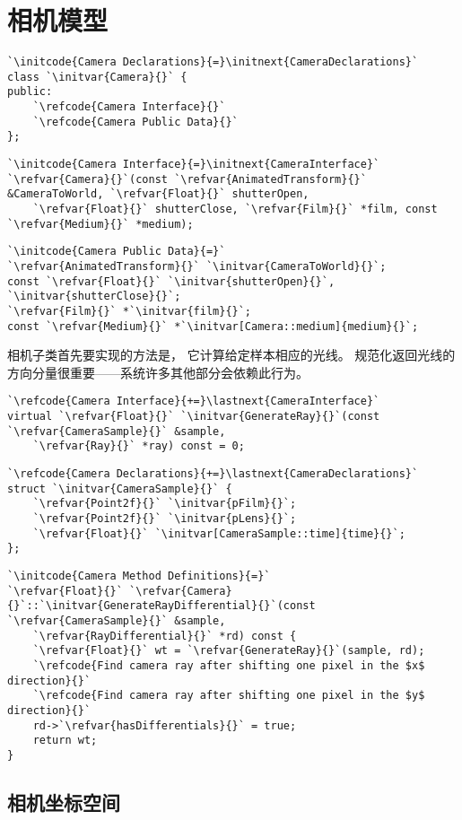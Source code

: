 \section{相机模型}\label{sec:相机模型}

\begin{lstlisting}
`\initcode{Camera Declarations}{=}\initnext{CameraDeclarations}`
class `\initvar{Camera}{}` {
public:
    `\refcode{Camera Interface}{}`
    `\refcode{Camera Public Data}{}`
};
\end{lstlisting}
\begin{lstlisting}
`\initcode{Camera Interface}{=}\initnext{CameraInterface}`
`\refvar{Camera}{}`(const `\refvar{AnimatedTransform}{}` &CameraToWorld, `\refvar{Float}{}` shutterOpen,
    `\refvar{Float}{}` shutterClose, `\refvar{Film}{}` *film, const `\refvar{Medium}{}` *medium);
\end{lstlisting}
\begin{lstlisting}
`\initcode{Camera Public Data}{=}`
`\refvar{AnimatedTransform}{}` `\initvar{CameraToWorld}{}`;
const `\refvar{Float}{}` `\initvar{shutterOpen}{}`, `\initvar{shutterClose}{}`;
`\refvar{Film}{}` *`\initvar{film}{}`;
const `\refvar{Medium}{}` *`\initvar[Camera::medium]{medium}{}`;
\end{lstlisting}
相机子类首先要实现的方法是，
它计算给定样本相应的光线。
规范化返回光线的方向分量很重要——系统许多其他部分会依赖此行为。
\begin{lstlisting}
`\refcode{Camera Interface}{+=}\lastnext{CameraInterface}`
virtual `\refvar{Float}{}` `\initvar{GenerateRay}{}`(const `\refvar{CameraSample}{}` &sample,
    `\refvar{Ray}{}` *ray) const = 0;
\end{lstlisting}
\begin{lstlisting}
`\refcode{Camera Declarations}{+=}\lastnext{CameraDeclarations}`
struct `\initvar{CameraSample}{}` {
    `\refvar{Point2f}{}` `\initvar{pFilm}{}`;
    `\refvar{Point2f}{}` `\initvar{pLens}{}`;
    `\refvar{Float}{}` `\initvar[CameraSample::time]{time}{}`;
};
\end{lstlisting}
\begin{lstlisting}
`\initcode{Camera Method Definitions}{=}`
`\refvar{Float}{}` `\refvar{Camera}{}`::`\initvar{GenerateRayDifferential}{}`(const `\refvar{CameraSample}{}` &sample,
    `\refvar{RayDifferential}{}` *rd) const {
    `\refvar{Float}{}` wt = `\refvar{GenerateRay}{}`(sample, rd);
    `\refcode{Find camera ray after shifting one pixel in the $x$ direction}{}`
    `\refcode{Find camera ray after shifting one pixel in the $y$ direction}{}`
    rd->`\refvar{hasDifferentials}{}` = true;
    return wt;
}
\end{lstlisting}

\subsection{相机坐标空间}\label{sub:相机坐标空间}